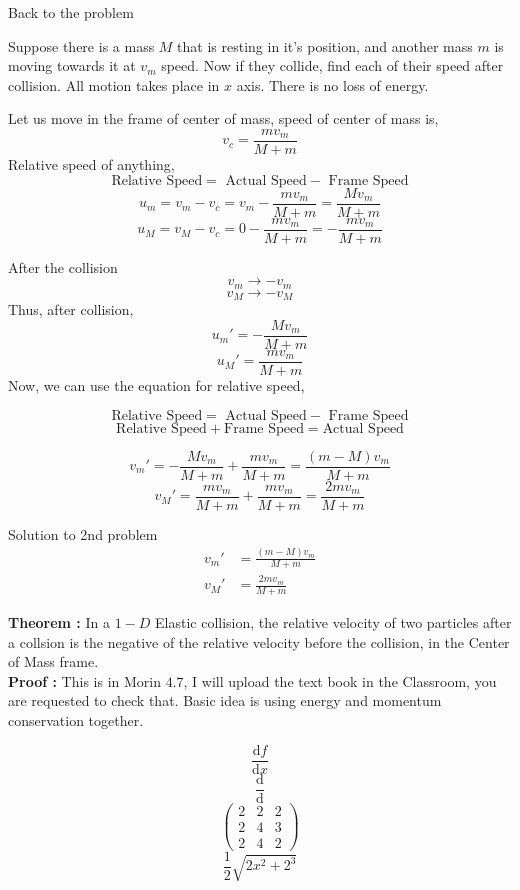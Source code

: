 \documentclass[9pt ]{memoir}
\newcommand{\prob}[1]{ \begin{problem.} #1 \end{problem.}}
\begin{document}
\begin{frame}
    {Back to the problem}
    \prob{Suppose there is a mass $M$ that is resting in it's position, and another mass $m$ is moving towards it at $v_m$ speed. Now if they collide, find each of their speed after collision. All motion takes place in $x$ axis. There is no loss of energy.\pause}
    {\begin{small}Let us move in the frame of center of mass, speed of center of mass is, 
        \[ v_c = \frac{m v_m}{M + m} \]
        Relative speed of anything, 
        \[ \text{Relative Speed} =\text{ Actual Speed} -\text{ Frame Speed} \]
        \[ u_m = v_m - v_c = v_m - \frac{mv_m}{M + m} = \frac{M v_m}{M + m} \]
       \[ u_M = v_M - v_c = 0 - \frac{mv_m}{M + m} =  - \frac{mv_m}{M + m}  \]
        
\end{small}} 
\end{frame}

\begin{frame}
    {After the collision}
    \[ v_m \to -v_m \]
    \[ v_M \to -v_M \]
    Thus, after collision,
    \[ u_m' = - \frac{M v_m}{M + m}  \]
    \[ u_M ' = \frac{mv_m}{M+m} \]
    Now, we can use the equation for relative speed, 
    
        \[ \text{Relative Speed} =\text{ Actual Speed} -\text{ Frame Speed} \]
        \[ \text{Relative Speed} + \text{Frame Speed} = \text{Actual Speed} \]
    
        \[ v_m'  = -\frac{Mv_m}{M+m} +   \frac{mv_m}{M+m } = \frac{\left( m - M \right) v_m}{M + m}       \]
        \[ v_M' =  \frac{mv_m}{M+m}  +  \frac{mv_m}{M+m} =  \frac{2mv_m}{M+m}   \]
        
\end{frame}
\begin{frame}
    {Solution to 2nd problem}
    \begin{align*}
        v_m' &= \frac{\left( m - M \right) v_m}{M + m} \\
        v_M' &=  \frac{2mv_m}{M+m} 
    \end{align*}
    
\end{frame}


\begin{frame}
    \textbf{Theorem :   } In a $1-D$ Elastic collision, the relative velocity of two particles after a collsion is the negative of the relative velocity before the collision, in the Center of Mass frame. \\
    \textbf{Proof :} This is in Morin $4.7$, I will upload the text book in the Classroom, you are requested to check that. Basic idea is using energy and momentum conservation together.
\end{frame}









\begin{frame}
    \[ \frac{\mathrm{d} f}{\mathrm{d} x} \]
     \[ \frac{\mathrm{d} }{\mathrm{d} } \]
     \[ \begin{pmatrix} 2 & 2 & 2 \\ 
     2 & 4 & 3 \\
 2 & 4 & 2\end{pmatrix}  \]
     \[ \frac{1}{2} \sqrt{2x^2+2^3}  \]
      
\end{frame}
\end{document}
